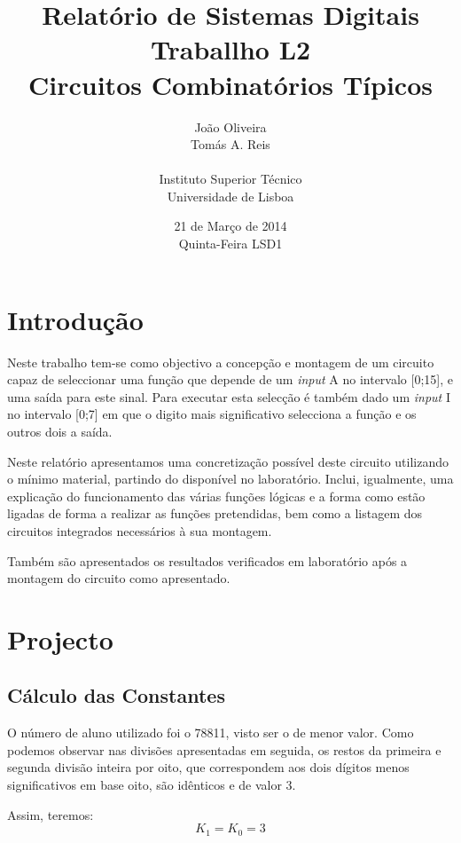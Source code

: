 \documentclass[a4paper,12pt]{article}
\begin{document}
\renewcommand{\sfdefault}{lmss}
\renewcommand{\familydefault}{\sfdefault}
\selectfont

\title{\bf Relatório de Sistemas Digitais \\
Traballho L2\\
Circuitos Combinatórios Típicos}
\author{João Oliveira\\
Tomás A. Reis\\
\\
Instituto Superior Técnico \\
Universidade de Lisboa}
\date{21 de Março de 2014 \\
Quinta-Feira LSD1}
\maketitle

\pagebreak
\section{Introdução}
Neste trabalho tem-se como objectivo a concepção e montagem de um circuito capaz de seleccionar uma função que depende de um {\it input} A no intervalo [0;15], e uma saída para este sinal. Para executar esta selecção é também dado um {\it input} I no intervalo [0;7] em que o digito mais significativo selecciona a função e os outros dois a saída. 
\par
Neste relatório apresentamos uma concretização possível deste circuito utilizando o mínimo material, partindo do disponível no laboratório. Inclui, igualmente, uma explicação do funcionamento das várias funções lógicas e a forma como estão ligadas de forma a realizar as funções pretendidas, bem como a listagem dos circuitos integrados necessários à sua montagem.
\par
Também são apresentados os resultados verificados em laboratório após a montagem do circuito como apresentado.

\section{Projecto}
\subsection{Cálculo das Constantes}
O número de aluno utilizado foi o 78811, visto ser o de menor valor. Como podemos observar nas divisões apresentadas em seguida, os restos da primeira e segunda divisão inteira por oito, que correspondem aos dois dígitos menos significativos em base oito, são idênticos e de valor 3. 
\par
\vspace*{1\baselineskip}
\hspace{20pt}  \hspace{60pt} 
\vspace*{1\baselineskip}
\par
Assim, teremos:
\begin{equation}
K_1=K_0=3
\end{equation}
\end{document}
